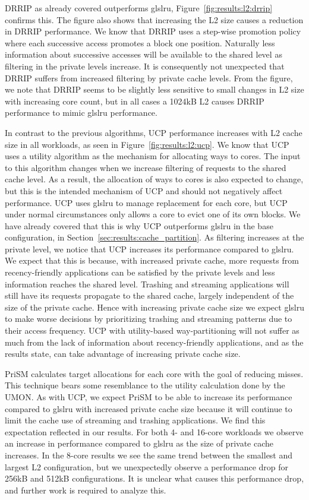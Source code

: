 DRRIP as already covered outperforms gls{lru}, Figure~\ref{fig:results:l2:drrip} confirms this.
The figure also shows that increasing the L2 size causes a reduction in DRRIP performance.
We know that DRRIP uses a step-wise promotion policy where each successive access promotes a block one position.
Naturally less information about successive accesses will be available to the shared level as filtering in the private levels increase.
It is consequently not unexpected that DRRIP suffers from increased filtering by private cache levels.
From the figure, we note that DRRIP seems to be slightly less sensitive to small changes in L2 size with increasing core count, but in all cases a 1024kB L2 causes DRRIP performance to mimic gls{lru} performance.

In contrast to the previous algorithms, UCP performance increases with L2 cache size in all workloads, as seen in Figure~\ref{fig:results:l2:ucp}.
We know that UCP uses a utility algorithm as the mechanism for allocating ways to cores. 
The input to this algorithm changes when we increase filtering of requests to the shared cache level.
As a result, the allocation of ways to cores is also expected to change, but this is the intended mechanism of UCP and should not negatively affect performance.
UCP uses gls{lru} to manage replacement for each core, but UCP under normal circumstances only allows a core to evict one of its own blocks. 
We have already covered that this is why UCP outperforms gls{lru} in the base configuration, in Section~\ref{sec:results:cache_partition}. 
As filtering increases at the private level, we notice that UCP increases its performance compared to gls{lru}. 
We expect that this is because, with increased private cache, more requests from recency-friendly applications can be satisfied by the private levels and less information reaches the shared level.
Trashing and streaming applications will still have its requests propagate to the shared cache, largely independent of the size of the private cache. 
Hence with increasing private cache size we expect gls{lru} to make worse decisions by prioritizing trashing and streaming patterns due to their access frequency.
UCP with utility-based way-partitioning will not suffer as much from the lack of information about recency-friendly applications, and as the results state, can take advantage of increasing private cache size.

PriSM calculates target allocations for each core with the goal of reducing misses.
This technique bears some resemblance to the utility calculation done by the UMON.
As with UCP, we expect PriSM to be able to increase its performance compared to gls{lru} with increased private cache size because it will continue to limit the cache use of streaming and trashing applications.
We find this expectation reflected in our results.
For both 4- and 16-core workloads we observe an increase in performance compared to gls{lru} as the size of private cache increases.
In the 8-core results we see the same trend between the smallest and largest L2 configuration, but we unexpectedly observe a performance drop for 256kB and 512kB configurations. 
It is unclear what causes this performance drop, and further work is required to analyze this.


